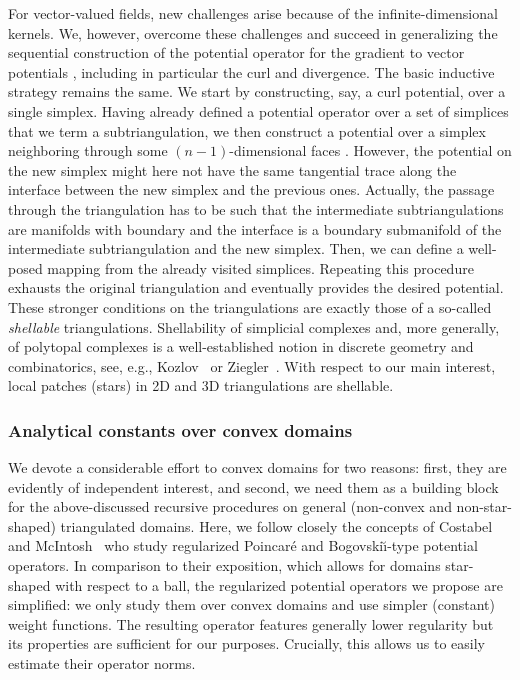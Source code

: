\documentclass[10pt,letterpaper]{article}
\newcommand\cye[1]{%
  \protect\leavevmode
  \begingroup
    \color{red!35!yellow}%
    #1%
  \endgroup
}
\begin{document}
For vector-valued fields, new challenges arise \cye{because of} the infinite-dimensional kernels. We, \cye{however, overcome these challenges and succeed in generalizing} the sequential construction of the potential operator for the gradient to vector potentials\cye{, including in particular} the curl and divergence. The basic inductive strategy remains the same. We start by constructing, say, a curl potential, over a single simplex. Having already defined a potential operator over a \cye{set of simplices that we term} a subtriangulation, we then construct a potential over a simplex \cye{neighboring through some $(n-1)$-dimensional faces}. However, the potential \cye{on the new simplex} might \cye{here} not have the same tangential trace along the interface between the new simplex and the previous ones. Actually, the passage through the triangulation has to be such that the intermediate subtriangulations are manifolds with boundary and the interface is a boundary submanifold of the intermediate subtriangulation and the new simplex. 
Then, we can define a well-posed \cye{mapping from the already visited simplices.} Repeating this procedure exhausts the original triangulation and eventually provides the desired potential.
These stronger conditions on the triangulations are exactly those of a so-called \emph{shellable} triangulations. Shellability of simplicial complexes and, more generally, of polytopal complexes is a well-established notion in discrete geometry and combinatorics, see, e.g., Kozlov~\cite{kozlov2008combinatorial} or Ziegler~\cite{ziegler1995lectures}.
With respect to our main interest, local \cye{patches} (stars) in 2D and 3D triangulations are shellable. 

\subsubsection{\cye{Analytical constants over convex domains}}

\cye{We devote a considerable effort to convex domains for two reasons: first, they are evidently of independent interest, and second, we need them as a building block for the above-discussed recursive procedures on general (non-convex and non-star-shaped) triangulated domains. Here,} we follow closely the \cye{concepts of} Costabel and McIntosh~\cite{costabel2010bogovskiui} who study regularized Poincar\'e and Bogovski\u{\i}-type potential operators. In comparison to their exposition, \cye{which allows for} domains star-shaped with respect to a ball, the regularized potential operators we propose are simplified: we only study them over convex domains and use simpler (constant) weight functions. 
The resulting operator features generally lower regularity \cye{but} its properties are sufficient for our purposes. \cye{Crucially, this allows us to} easily estimate their operator norms. 
\end{document}
